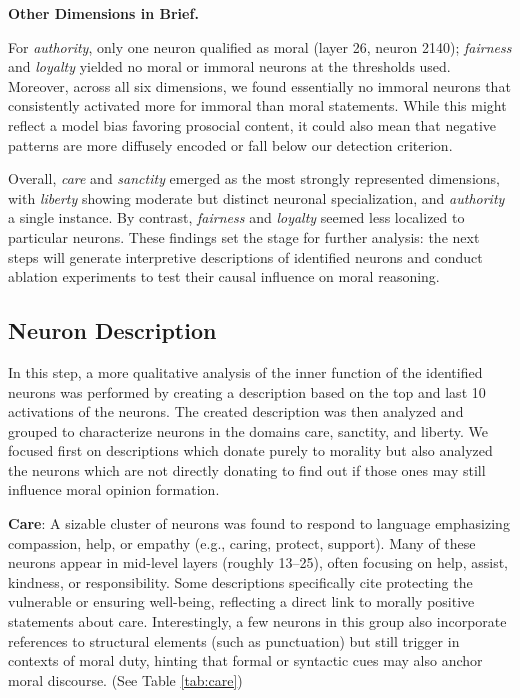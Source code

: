 \documentclass[runninghheads]{llncs}
\begin{document}
\textbf{Other Dimensions in Brief.}

For \textit{authority}, only one neuron qualified as moral (layer 26, neuron 2140); \textit{fairness} and \textit{loyalty} yielded no moral or immoral neurons at the thresholds used. Moreover, across all six dimensions, we found essentially no immoral neurons that consistently activated more for immoral than moral statements. While this might reflect a model bias favoring prosocial content, it could also mean that negative patterns are more diffusely encoded or fall below our detection criterion.

Overall, \textit{care} and \textit{sanctity} emerged as the most strongly represented dimensions, with \textit{liberty} showing moderate but distinct neuronal specialization, and \textit{authority} a single instance. By contrast, \textit{fairness} and \textit{loyalty} seemed less localized to particular neurons. These findings set the stage for further analysis: the next steps will generate interpretive descriptions of identified neurons and conduct ablation experiments to test their causal influence on moral reasoning.

\subsection{Neuron Description}

In this step, a more qualitative analysis of the inner function of the identified neurons was performed by creating a description based on the top and last 10 activations of the neurons. The created description was then analyzed and grouped to characterize neurons in the domains care, sanctity, and liberty. We focused first on descriptions which donate purely to morality but also analyzed the neurons which are not directly donating to find out if those ones may still influence moral opinion formation.

\textbf{Care}: A sizable cluster of neurons was found to respond to language emphasizing compassion, help, or empathy (e.g., caring, protect, support). Many of these neurons appear in mid-level layers (roughly 13–25), often focusing on help, assist, kindness, or responsibility. Some descriptions specifically cite protecting the vulnerable or ensuring well-being, reflecting a direct link to morally positive statements about care. Interestingly, a few neurons in this group also incorporate references to structural elements (such as punctuation) but still trigger in contexts of moral duty, hinting that formal or syntactic cues may also anchor moral discourse. (See Table \ref{tab:care})
\end{document}
